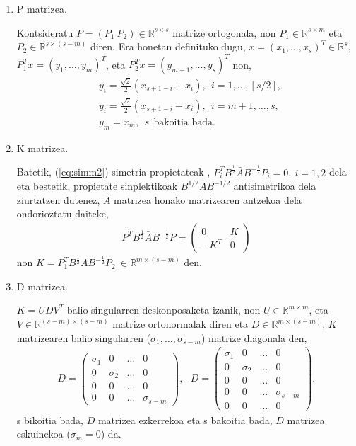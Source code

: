 \begin{enumerate}
\item P matrizea.

Kontsideratu $P=(P_1 \ P_2) \in \mathbb{R}^{s \times s}$ matrize ortogonala, non $P_1 \in \mathbb{R}^{s \times m}$ eta $P_2 \in \mathbb{R}^{s \times (s-m)}$ diren. Era honetan definituko dugu,  $x=(x_1,\dots,x_s)^T \in \mathbb{R}^s$, $P_1^Tx=(y_1,\dots,y_m)^T$, eta $P_2^Tx=(y_{m+1},\dots,y_s)^T$ non,
\begin{align*}
&y_i = \frac{\sqrt{2}}{2} (x_{s+1-i}+x_i), \ \ i=1,\dots,[s/2], \\
&y_i =\frac{\sqrt{2}}{2} (x_{s+1-i}-x_{i}), \ \ i=m+1,\dots,s, \\
&y_{m} = x_{m}, \ \ s \ \ \mbox{bakoitia bada}.
\end{align*}  

\item K matrizea.

Batetik, (\ref{eq:simm2}) simetria propietateak ,  $P_i^TB^{\frac{1}{2}}\bar{A}B^{-\frac{1}{2}}P_i=0, \ i=1,2$ dela eta bestetik, propietate sinplektikoak $B^{1/2}\bar{A}B^{-1/2}$ antisimetrikoa dela ziurtatzen dutenez, $\bar{A}$ matrizea honako matrizearen antzekoa dela ondorioztatu daiteke,
\begin{align}
P^TB^{\frac{1}{2}}\bar{A}B^{-\frac{1}{2}}P=
\left(
\begin{matrix}
0 & K \\
-K^T & 0
\end{matrix}
\right)
\end{align}
non $K=P_1^TB^{\frac{1}{2}}\bar{A}B^{-\frac{1}{2}}P_2 \ \in \mathbb{R}^{m \times (s-m)}$ den.

\item D matrizea.

$K=UDV^T$ balio singularren deskonposaketa izanik, non $U \in \mathbb{R}^{m \times m}$, eta $V \in \mathbb{R}^{(s-m) \times (s-m)}$ matrize ortonormalak diren eta $D \in \mathbb{R}^{m \times (s-m)}$, $K$ matrizearen balio singularren ($\sigma_1, \dots, \sigma_{s-m}$) matrize diagonala den,
\begin{align}
\label{eq:Dmat}
D=
\left(
\begin{matrix}
\sigma_1 & 0 & \dots & 0 \\
0 & \sigma_2 & \dots & 0 \\
0 & 0 & \dots & 0 \\
0 & 0 & \dots & \sigma_{s-m}
\end{matrix}
\right), \ \ \
D=
\left(
\begin{matrix}
\sigma_1 & 0 & \dots & 0 \\
0 & \sigma_2 & \dots & 0 \\
0 & 0 & \dots & 0 \\
0 & 0 & \dots & \sigma_{s-m} \\
0 & 0 & \dots & 0
\end{matrix}
\right).
\end{align}
s bikoitia bada, $D$ matrizea ezkerrekoa eta s bakoitia bada, $D$ matrizea eskuinekoa ($\sigma_m=0$) da. 


\end{enumerate}
